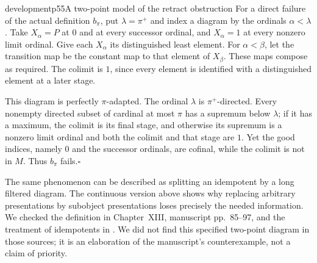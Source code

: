 \begin{dcomment}{development}{p55}{A two-point model of the retract obstruction}
For a direct failure of the actual definition $b_\pi$, put $\lambda=\pi^+$ and index a diagram by the ordinals $\alpha<\lambda$. Take $X_\alpha=P$ at $0$ and at every successor ordinal, and $X_\alpha=1$ at every nonzero limit ordinal. Give each $X_\alpha$ its distinguished least element. For $\alpha<\beta$, let the transition map be the constant map to that element of $X_\beta$. These maps compose as required. The colimit is $1$, since every element is identified with a distinguished element at a later stage.

This diagram is perfectly $\pi$-adapted. The ordinal $\lambda$ is $\pi^+$-directed. Every nonempty directed subset of cardinal at most $\pi$ has a supremum below $\lambda$; if it has a maximum, the colimit is its final stage, and otherwise its supremum is a nonzero limit ordinal and both the colimit and that stage are $1$. Yet the good indices, namely $0$ and the successor ordinals, are cofinal, while the colimit is not in $M$. Thus $b_\pi$ fails.\hfill$\square$

The same phenomenon can be described as splitting an idempotent by a long filtered diagram. The continuous version above shows why replacing arbitrary presentations by subobject presentations loses precisely the needed information. We checked the definition in Chapter~XIII, manuscript pp.~85--97, and the treatment of idempotents in \citep[Expos\'e~I, 8.6.5 and 10.6]{SGA4I1972}. We did not find this specified two-point diagram in those sources; it is an elaboration of the manuscript's counterexample, not a claim of priority.
\end{dcomment}

